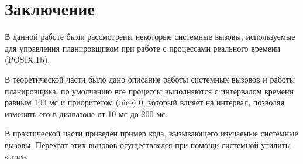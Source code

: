 \newpage
\section*{Заключение}

В данной работе были рассмотрены некоторые системные вызовы, используемые для управления планировщиком при работе с процессами реального времени (POSIX.1b).

В теоретической части было дано описание работы системных вызовов и работы планировщика; по умолчанию все процессы выполняются с интервалом времени равным 100 мс и приоритетом (nice) 0, который влияет на интервал, позволяя изменять его в диапазоне от 10 мс до 200 мс.

В практической части приведён пример кода, вызывающего изучаемые системные вызовы. Перехват этих вызовов осуществлялся при помощи системной утилиты strace.